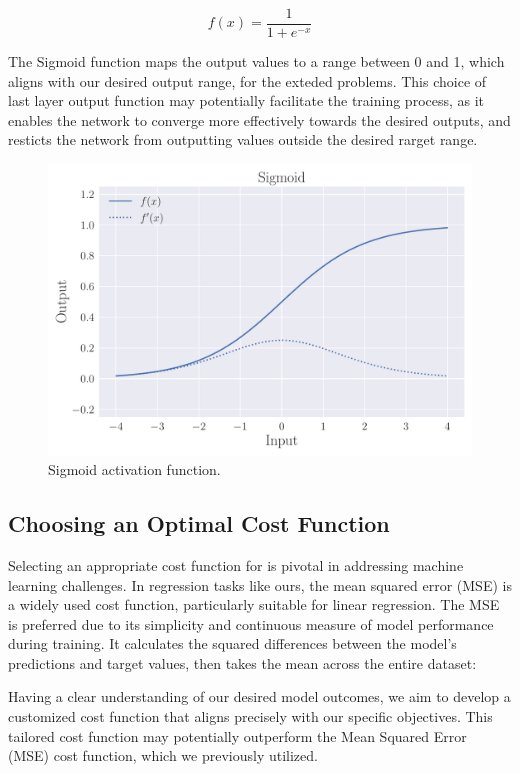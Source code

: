 \documentclass[a4paper, UKenglish, 11pt]{uiomaster}
\begin{document}
\begin{equation}
  f(x) = \frac{1}{1 + e^{-x}}
\label{eq:Sigmoid}
\end{equation}

The Sigmoid function maps the output values to a range between 0 and 1, which aligns with our desired output range, for the exteded problems. This choice of last layer output function may potentially facilitate the training process, as it enables the network to converge more effectively towards the desired outputs, and resticts the network from outputting values outside the desired rarget range.

\begin{figure}
    \centering
    \includegraphics[width=\linewidth]{figures/Sigmoid.pdf}
    \caption{ Sigmoid activation function.}
    \label{fig:sigmoid}
\end{figure}


\subsection{Choosing an Optimal Cost Function}
Selecting an appropriate cost function for is pivotal in addressing machine learning challenges. In regression tasks like ours, the mean squared error (MSE) is a widely used cost function, particularly suitable for linear regression. The MSE is preferred due to its simplicity and continuous measure of model performance during training. It calculates the squared differences between the model's predictions and target values, then takes the mean across the entire dataset:

Having a clear understanding of our desired model outcomes, we aim to develop a customized cost function that aligns precisely with our specific objectives. This tailored cost function may potentially outperform the Mean Squared Error (MSE) cost function, which we previously utilized.
\end{document}
